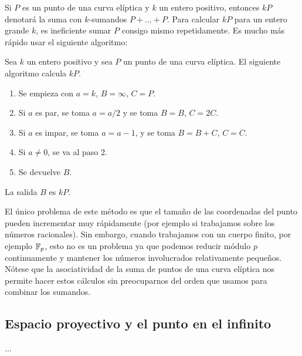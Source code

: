 Si $P$ es un punto de una curva elíptica y $k$ un entero positivo, entonces $k P$ denotará la suma con $k$-sumandos $P + \ldots + P$. Para calcular $k P$ para un entero grande $k$, es ineficiente sumar $P$ consigo mismo repetidamente.  Es mucho más rápido usar el siguiente algoritmo:

\begin{algoritmo}
	Sea $k$ un entero positivo y sea $P$ un punto de una curva elíptica. El siguiente algoritmo calcula $kP$.
	\begin{enumerate}
		\item Se empieza con $a = k$, $B = \infty$, $C = P$.
		\item Si $a$ es par, se toma $a = a/2$ y se toma $B = B$, $C = 2 C$.
		\item Si $a$ es impar, se toma $a = a -1$, y se toma $B = B + C$, $C = C$.
		\item Si $a \neq 0$, se va al paso 2.
		\item Se devuelve $B$.
	\end{enumerate}
	La salida $B$ es $kP$.
\end{algoritmo}

El único problema de este método es que el tamaño de las coordenadas del punto pueden incrementar muy rápidamente (por ejemplo si trabajamos sobre los números racionales). Sin embargo, cuando trabajamos con un cuerpo finito, por ejemplo $\mathbb{F}_p$, esto no es un problema ya que podemos reducir módulo $p$ continuamente y mantener los números involucrados relativamente pequeños. Nótese que la asociatividad de la suma de puntos de una curva elíptica nos permite hacer estos cálculos sin preocuparnos del orden que usamos para combinar los sumandos.

\subsection{Espacio proyectivo y el punto en el infinito}
\label{sub:Espacio proyectivo y el punto en el infinito}

...
